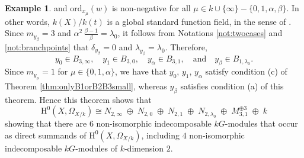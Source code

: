 \documentclass{amsart}
\numberwithin{equation}{section}
\numberwithin{table}{section}
\theoremstyle{plain}
\theoremstyle{definition}
\newtheorem{example}[theorem]{Example}
\theoremstyle{remark}
\newcommand{\HH}{\mathrm{H}}
\begin{document}
\begin{example}
and $\mathrm{ord}_{x_\mu}(w)$ is non-negative for all $\mu\in k\cup\{\infty\}-\{0,1,\alpha,\beta\}$. In other words, $k(X)/k(t)$ is a global standard function field, in the sense of \cite[Definitions 2.1 and 3.1]{MarquesWard2018}.  Since $m_{y_\beta}=3$ and $\alpha^2\,\frac{\beta-1}{\beta}=\lambda_0$, it follows from Notations \ref{not:twocases} and \ref{not:branchpoints} that $\delta_{y_\beta}=0$ and $\lambda_{y_\beta}=\lambda_0$. Therefore,
$$y_0\in B_{3,\infty}, \quad y_1\in B_{3,0},\quad y_{\alpha}\in B_{3,1},\quad\mbox{and}\quad
y_{\beta}\in B_{1,\lambda_0}.$$
Since $m_{y_\mu}=1$ for $\mu\in\{0,1,\alpha\}$, we have that $y_0$, $y_1$, $y_\alpha$ satisfy condition (c) of Theorem \ref{thm:onlyB1orB2B3small}, whereas $y_{\beta}$ satisfies condition (a) of this theorem. Hence this theorem shows that
$$\HH^0(X,\Omega_{X/k})\cong  N_{2,\infty} \;\oplus\; N_{2,0} \;\oplus\; N_{2,1} \;\oplus\; N_{2,\lambda_0} 
\;\oplus\; M_{3,1}^{\oplus 3} \;\oplus\; k$$
showing that there are $6$ non-isomorphic indecomposable $kG$-modules that occur as direct summands of $\HH^0(X,\Omega_{X/k})$, including $4$ non-isomorphic indecomposable $kG$-modules of $k$-dimension $2$. 
\end{example}
\end{document}
